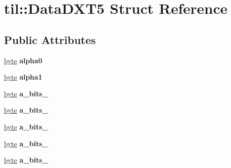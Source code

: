 \hypertarget{structtil_1_1_data_d_x_t5}{
\section{til::DataDXT5 Struct Reference}
\label{structtil_1_1_data_d_x_t5}
}
\subsection*{Public Attributes}
\begin{DoxyCompactItemize}
\item 
\hypertarget{structtil_1_1_data_d_x_t5_a098c2277b605a698aef751a7c860aa1f}{
\hyperlink{namespacetil_a5f3ec10aca1a788b495a0bd3787bc2dc}{byte} {\bfseries alpha0}}
\label{structtil_1_1_data_d_x_t5_a098c2277b605a698aef751a7c860aa1f}

\item 
\hypertarget{structtil_1_1_data_d_x_t5_ac258b424688157d783f4a34d17263948}{
\hyperlink{namespacetil_a5f3ec10aca1a788b495a0bd3787bc2dc}{byte} {\bfseries alpha1}}
\label{structtil_1_1_data_d_x_t5_ac258b424688157d783f4a34d17263948}

\item 
\hypertarget{structtil_1_1_data_d_x_t5_ad212bb4274f7ed121d476be5acf6e786}{
\hyperlink{namespacetil_a5f3ec10aca1a788b495a0bd3787bc2dc}{byte} {\bfseries a\_\-bits\_}}
\label{structtil_1_1_data_d_x_t5_ad212bb4274f7ed121d476be5acf6e786}

\item 
\hypertarget{structtil_1_1_data_d_x_t5_acc99670cfc2a15130629ee115743469c}{
\hyperlink{namespacetil_a5f3ec10aca1a788b495a0bd3787bc2dc}{byte} {\bfseries a\_\-bits\_}}
\label{structtil_1_1_data_d_x_t5_acc99670cfc2a15130629ee115743469c}

\item 
\hypertarget{structtil_1_1_data_d_x_t5_a13f310dcf6ea268b8be7968e2992d76d}{
\hyperlink{namespacetil_a5f3ec10aca1a788b495a0bd3787bc2dc}{byte} {\bfseries a\_\-bits\_}}
\label{structtil_1_1_data_d_x_t5_a13f310dcf6ea268b8be7968e2992d76d}

\item 
\hypertarget{structtil_1_1_data_d_x_t5_accbb60b17520ae301672e9589f7d783a}{
\hyperlink{namespacetil_a5f3ec10aca1a788b495a0bd3787bc2dc}{byte} {\bfseries a\_\-bits\_}}
\label{structtil_1_1_data_d_x_t5_accbb60b17520ae301672e9589f7d783a}

\item 
\hypertarget{structtil_1_1_data_d_x_t5_ab7bbee504824a88f236f0fa4eb29032d}{
\hyperlink{namespacetil_a5f3ec10aca1a788b495a0bd3787bc2dc}{byte} {\bfseries a\_\-bits\_}}
\label{structtil_1_1_data_d_x_t5_ab7bbee504824a88f236f0fa4eb29032d}


\end{DoxyCompactItemize}
